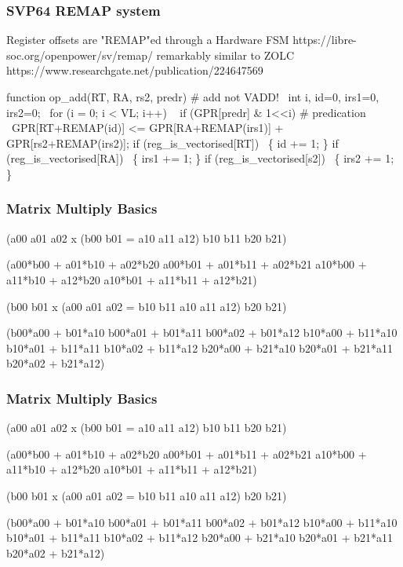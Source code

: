 \documentclass[slidestop]{beamer}
\begin{document}
\begin{frame}[fragile]
\frametitle{SVP64 REMAP system}

\begin{semiverbatim}
Register offsets are "REMAP"ed through a Hardware FSM
https://libre-soc.org/openpower/sv/remap/
remarkably similar to ZOLC
https://www.researchgate.net/publication/224647569

function op\_add(RT, RA, rs2, predr) # add not VADD!
  int i, id=0, irs1=0, irs2=0;
  for (i = 0; i < VL; i++)
    if (GPR[predr] & 1<<i) # predication
       GPR[RT+REMAP(id)] <= GPR[RA+REMAP(irs1)] +
                           GPR[rs2+REMAP(irs2)];
    if (reg\_is\_vectorised[RT])  \{ id += 1; \}
    if (reg\_is\_vectorised[RA])  \{ irs1 += 1; \}
    if (reg\_is\_vectorised[s2])  \{ irs2 += 1; \}
\end{semiverbatim}

\end{frame}

\begin{frame}[fragile]
\frametitle{Matrix Multiply Basics}

\begin{semiverbatim}
(a00 a01 a02  x (b00 b01   =
 a10 a11 a12)    b10 b11
                 b20 b21)

(a00*b00 + a01*b10 + a02*b20 a00*b01 + a01*b11 + a02*b21
 a10*b00 + a11*b10 + a12*b20 a10*b01 + a11*b11 + a12*b21)

 (b00 b01    x (a00 a01 a02  =
  b10 b11       a10 a11 a12)
  b20 b21)

(b00*a00 + b01*a10  b00*a01 + b01*a11  b00*a02 + b01*a12
 b10*a00 + b11*a10  b10*a01 + b11*a11  b10*a02 + b11*a12
 b20*a00 + b21*a10  b20*a01 + b21*a11  b20*a02 + b21*a12)

\end{semiverbatim}

\end{frame}


\begin{frame}[fragile]
\frametitle{Matrix Multiply Basics}

\begin{semiverbatim}
(a00 a01 a02  x (b00 b01   =
 a10 a11 a12)    b10 b11
                 b20 b21)

(a00*b00 + a01*b10 + a02*b20 a00*b01 + a01*b11 + a02*b21
 a10*b00 + a11*b10 + a12*b20 a10*b01 + a11*b11 + a12*b21)

 (b00 b01    x (a00 a01 a02  =
  b10 b11       a10 a11 a12)
  b20 b21)

(b00*a00 + b01*a10  b00*a01 + b01*a11  b00*a02 + b01*a12
 b10*a00 + b11*a10  b10*a01 + b11*a11  b10*a02 + b11*a12
 b20*a00 + b21*a10  b20*a01 + b21*a11  b20*a02 + b21*a12)

\end{semiverbatim}

\end{frame}
\end{document}
